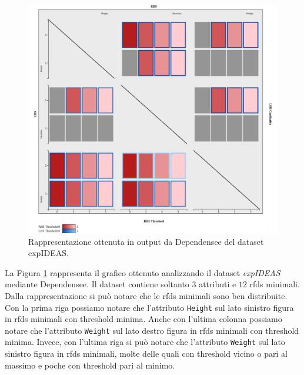 \begin{figure}[ht]
    \centering
    \includegraphics[width=\linewidth]{capitoli/figure/expIDEAS}
    \caption{Rappresentazione ottenuta in output da Dependensee del dataset expIDEAS.}
    \label{fig:expidea_result}
\end{figure}
La Figura \ref{fig:expidea_result} rappresenta il grafico ottenuto analizzando il dataset \textit{expIDEAS} mediante Dependensee. Il dataset contiene soltanto $3$ attributi e $12$ \acrlong{rfds} minimali. Dalla rappresentazione si pu\`{o} notare che le \acrlong{rfds} minimali sono ben distribuite. Con la prima riga possiamo notare che l'attributo \texttt{Height} sul lato sinistro figura in \acrlong{rfds} minimali con threshold minima. Anche con l'ultima colonna possiamo notare che l'attributo \texttt{Weight} sul lato destro figura in \acrlong{rfds} minimali con threshold minima. Invece, con l'ultima riga si pu\`{o} notare che l'attributo \texttt{Weight} sul lato sinistro figura in \acrlong{rfds} minimali, molte delle quali con threshold vicino o pari al massimo e poche con threshold pari al minimo.\par
